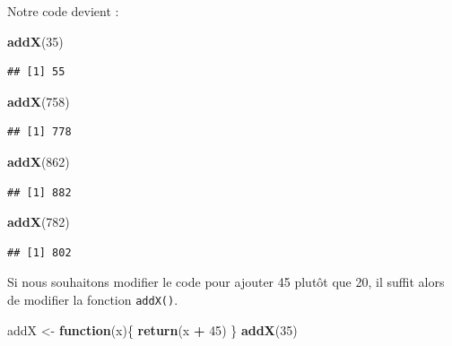 \documentclass[
]{book}
\newenvironment{Shaded}{\begin{snugshade}}{\end{snugshade}}
\newcommand{\ControlFlowTok}[1]{\textcolor[rgb]{0.13,0.29,0.53}{\textbf{#1}}}
\newcommand{\DecValTok}[1]{\textcolor[rgb]{0.00,0.00,0.81}{#1}}
\newcommand{\KeywordTok}[1]{\textcolor[rgb]{0.13,0.29,0.53}{\textbf{#1}}}
\newcommand{\NormalTok}[1]{#1}
\newcommand{\OperatorTok}[1]{\textcolor[rgb]{0.81,0.36,0.00}{\textbf{#1}}}
\newcommand{\StringTok}[1]{\textcolor[rgb]{0.31,0.60,0.02}{#1}}
\begin{document}
Notre code devient :

\begin{Shaded}
\begin{Highlighting}[]
\KeywordTok{addX}\NormalTok{(}\DecValTok{35}\NormalTok{)}
\end{Highlighting}
\end{Shaded}

\begin{verbatim}
## [1] 55
\end{verbatim}

\begin{Shaded}
\begin{Highlighting}[]
\KeywordTok{addX}\NormalTok{(}\DecValTok{758}\NormalTok{)}
\end{Highlighting}
\end{Shaded}

\begin{verbatim}
## [1] 778
\end{verbatim}

\begin{Shaded}
\begin{Highlighting}[]
\KeywordTok{addX}\NormalTok{(}\DecValTok{862}\NormalTok{)}
\end{Highlighting}
\end{Shaded}

\begin{verbatim}
## [1] 882
\end{verbatim}

\begin{Shaded}
\begin{Highlighting}[]
\KeywordTok{addX}\NormalTok{(}\DecValTok{782}\NormalTok{)}
\end{Highlighting}
\end{Shaded}

\begin{verbatim}
## [1] 802
\end{verbatim}

Si nous souhaitons modifier le code pour ajouter 45 plutôt que 20, il suffit alors de modifier la fonction \texttt{addX()}.

\begin{Shaded}
\begin{Highlighting}[]
\NormalTok{addX <-}\StringTok{ }\ControlFlowTok{function}\NormalTok{(x)\{}
  \KeywordTok{return}\NormalTok{(x }\OperatorTok{+}\StringTok{ }\DecValTok{45}\NormalTok{)}
\NormalTok{\}}
\KeywordTok{addX}\NormalTok{(}\DecValTok{35}\NormalTok{)}
\end{Highlighting}
\end{Shaded}
\end{document}
